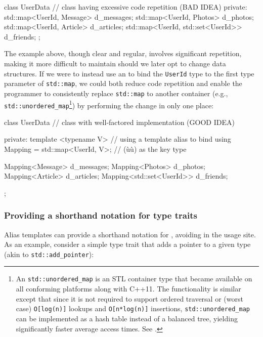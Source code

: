 \begin{emcppslisting}[language=C++]
class UserData  // class having excessive code repetition (BAD IDEA)
{
private:
    std::map<UserId, Message>          d_messages;
    std::map<UserId, Photos>           d_photos;
    std::map<UserId, Article>          d_articles;
    std::map<UserId, std::set<UserId>> d_friends;
};
\end{emcppslisting}

\noindent The example above, though clear and regular, involves significant
repetition, making it more difficult to maintain should we later opt to
change data structures. If we were to instead use an  to bind the \lstinline!UserId! type to the first type
parameter of \lstinline!std::map!, we could both reduce code repetition
and enable the programmer to consistently replace \lstinline!std::map!
to another container
(e.g., \lstinline!std::unordered_map!{\cprotect\footnote{An
\lstinline!std::unordered_map! is an STL container type that became
available on all conforming platforms along with C++11. The
functionality is similar except that since it is not required to
support ordered traversal or (worst case) \lstinline!O[log(n)]! lookups
and \lstinline!O[n*log(n)]! insertions, \lstinline!std::unordered_map! can
be implemented as a hash table instead of a balanced tree, yielding
significantly faster average access times. See
  \cite{cpprefb}.}}) by performing the change in only
one place:

\begin{emcppslisting}[language=C++]
class UserData  // class with well-factored implementation (GOOD IDEA)
{
private:
    template <typename V>                  // using a template alias to bind
    using Mapping = std::map<UserId, V>;   // (ù{}ù) as the key type

    Mapping<Message>          d_messages;
    Mapping<Photos>           d_photos;
    Mapping<Article>          d_articles;
    Mapping<std::set<UserId>> d_friends;
};
\end{emcppslisting}


\subsubsection[Providing a shorthand notation for type traits]{Providing a shorthand notation for type traits}\label{providing-a-shorthand-notation-for-type-traits}

Alias templates can provide a shorthand notation for , avoiding  in the usage site. As an
example, consider a simple type trait that adds a pointer to a given
type (akin to \lstinline!std::add_pointer!):

